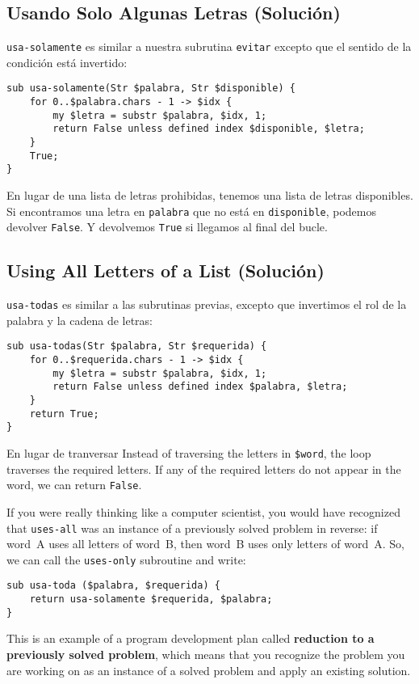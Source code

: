 \subsection{Usando Solo Algunas Letras (Solución)}

\verb"usa-solamente" es similar a nuestra subrutina {\tt evitar} 
excepto que el sentido de la condición está invertido:

\begin{verbatim}
sub usa-solamente(Str $palabra, Str $disponible) {
    for 0..$palabra.chars - 1 -> $idx {
        my $letra = substr $palabra, $idx, 1;
        return False unless defined index $disponible, $letra;
    }
    True;
}
\end{verbatim}
%
En lugar de una lista de letras prohibidas, tenemos una lista
de letras disponibles. Si encontramos una letra en {\tt palabra}
que no está en {\tt disponible}, podemos devolver {\tt False}. 
Y devolvemos {\tt True} si llegamos al final del bucle.

\subsection{Using All Letters of a List (Solución)}

\verb"usa-todas" es similar a las subrutinas previas,
excepto que invertimos el rol de la palabra y la cadena 
de letras:

\begin{verbatim}
sub usa-todas(Str $palabra, Str $requerida) {
    for 0..$requerida.chars - 1 -> $idx {
        my $letra = substr $palabra, $idx, 1;
        return False unless defined index $palabra, $letra;
    }
    return True;
}
\end{verbatim}
%
En lugar de tranversar 
Instead of traversing the letters in {\tt \$word}, the loop
traverses the required letters.  If any of the required letters
do not appear in the word, we can return {\tt False}.

If you were really thinking like a computer scientist, you would
have recognized that \verb"uses-all" was an instance of a
previously solved problem in reverse: if word~A uses all 
letters of word~B, then word~B uses only letters of word~A. So, 
we can call the {\tt uses-only} subroutine and write:

\begin{verbatim}
sub usa-toda ($palabra, $requerida) {
    return usa-solamente $requerida, $palabra;
}
\end{verbatim}
%
This is an example of a program development plan called 
{\bf reduction to a previously solved problem}, which means that you
recognize the problem you are working on as an instance of a solved
problem and apply an existing solution. 

